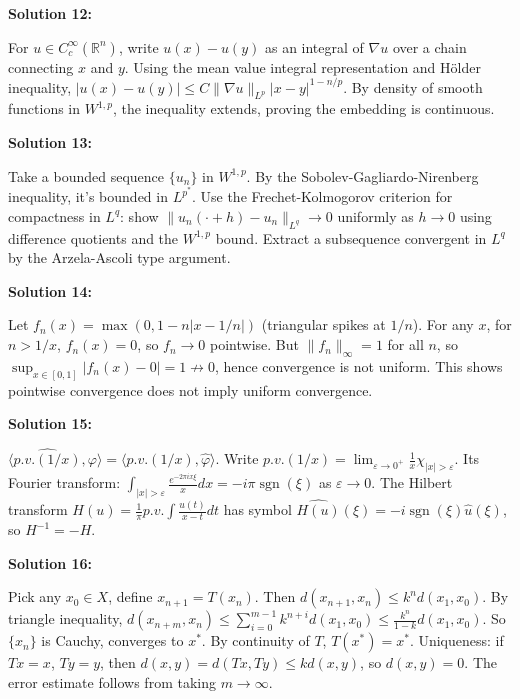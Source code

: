 \documentclass[12pt,a4paper]{exam}
\begin{document}
\vspace{0.5cm}

\textbf{Solution 12:}

For $u \in C_c^\infty(\mathbb{R}^n)$, write $u(x) - u(y)$ as an integral of $\nabla u$ over a chain connecting $x$ and $y$. Using the mean value integral representation and H\"older inequality, $|u(x) - u(y)| \leq C \|\nabla u\|_{L^p} |x-y|^{1-n/p}$. By density of smooth functions in $W^{1,p}$, the inequality extends, proving the embedding is continuous.

\vspace{0.5cm}

\textbf{Solution 13:}

Take a bounded sequence $\{u_n\}$ in $W^{1,p}$. By the Sobolev-Gagliardo-Nirenberg inequality, it's bounded in $L^{p^*}$. Use the Frechet-Kolmogorov criterion for compactness in $L^q$: show $\|u_n(\cdot + h) - u_n\|_{L^q} \to 0$ uniformly as $h \to 0$ using difference quotients and the $W^{1,p}$ bound. Extract a subsequence convergent in $L^q$ by the Arzela-Ascoli type argument.

\vspace{0.5cm}

\textbf{Solution 14:}

Let $f_n(x) = \max(0, 1 - n|x - 1/n|)$ (triangular spikes at $1/n$). For any $x$, for $n > 1/x$, $f_n(x) = 0$, so $f_n \to 0$ pointwise. But $\|f_n\|_\infty = 1$ for all $n$, so $\sup_{x \in [0,1]} |f_n(x) - 0| = 1 \not\to 0$, hence convergence is not uniform. This shows pointwise convergence does not imply uniform convergence.

\vspace{0.5cm}

\textbf{Solution 15:}

$\langle \widehat{p.v.(1/x)}, \varphi \rangle = \langle p.v.(1/x), \widehat{\varphi} \rangle$. Write $p.v.(1/x) = \lim_{\varepsilon \to 0^+} \frac{1}{x} \chi_{|x|>\varepsilon}$. Its Fourier transform: $\int_{|x|>\varepsilon} \frac{e^{-2\pi i x \xi}}{x} dx = -i\pi \operatorname{sgn}(\xi)$ as $\varepsilon \to 0$. The Hilbert transform $H(u) = \frac{1}{\pi} p.v. \int \frac{u(t)}{x-t} dt$ has symbol $\widehat{H(u)}(\xi) = -i \operatorname{sgn}(\xi) \widehat{u}(\xi)$, so $H^{-1} = -H$.

\vspace{0.5cm}

\textbf{Solution 16:}

Pick any $x_0 \in X$, define $x_{n+1} = T(x_n)$. Then $d(x_{n+1}, x_n) \leq k^n d(x_1, x_0)$. By triangle inequality, $d(x_{n+m}, x_n) \leq \sum_{i=0}^{m-1} k^{n+i} d(x_1, x_0) \leq \frac{k^n}{1-k} d(x_1, x_0)$. So $\{x_n\}$ is Cauchy, converges to $x^*$. By continuity of $T$, $T(x^*) = x^*$. Uniqueness: if $Tx=x$, $Ty=y$, then $d(x,y) = d(Tx,Ty) \leq k d(x,y)$, so $d(x,y)=0$. The error estimate follows from taking $m \to \infty$.
\end{document}
